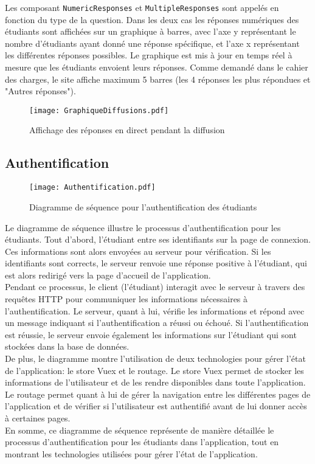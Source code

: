 Les composant \texttt{NumericResponses} et \texttt{MultipleResponses} sont appelés en fonction du type de la question. Dans les deux cas les réponses numériques des étudiants sont affichées sur un graphique à barres, avec l'axe y représentant le nombre d'étudiants ayant donné une réponse spécifique, et l'axe x représentant les différentes réponses possibles. Le graphique est mis à jour en temps réel à mesure que les étudiants envoient leurs réponses. Comme demandé dans le cahier des charges, le site affiche maximum 5 barres (les 4 réponses les plus répondues et "Autres réponses").

\vspace{3mm}
\begin{figure}[H]
\texttt{[image: GraphiqueDiffusions.pdf]}
\caption{Affichage des réponses en direct pendant la diffusion}
\end{figure}
\vspace{2mm}

\subsection{Authentification}
\begin{figure}[H]
\centering
\texttt{[image: Authentification.pdf]}
\caption{Diagramme de séquence pour l'authentification des étudiants}
\end{figure}

Le diagramme de séquence illustre le processus d'authentification pour les étudiants. Tout d'abord, l'étudiant entre ses identifiants sur la page de connexion. Ces informations sont alors envoyées au serveur pour vérification. Si les identifiants sont corrects, le serveur renvoie une réponse positive à l'étudiant, qui est alors redirigé vers la page d'accueil de l'application.\\

Pendant ce processus, le client (l'étudiant) interagit avec le serveur à travers des requêtes HTTP pour communiquer les informations nécessaires à l'authentification. Le serveur, quant à lui, vérifie les informations et répond avec un message indiquant si l'authentification a réussi ou échoué. Si l'authentification est réussie, le serveur envoie également les informations sur l'étudiant qui sont stockées dans la base de données.\\

De plus, le diagramme montre l'utilisation de deux technologies pour gérer l'état de l'application: le store Vuex et le routage. Le store Vuex permet de stocker les informations de l'utilisateur et de les rendre disponibles dans toute l'application. Le routage permet quant à lui de gérer la navigation entre les différentes pages de l'application et de vérifier si l'utilisateur est authentifié avant de lui donner accès à certaines pages.\\

En somme, ce diagramme de séquence représente de manière détaillée le processus d'authentification pour les étudiants dans l'application, tout en montrant les technologies utilisées pour gérer l'état de l'application.